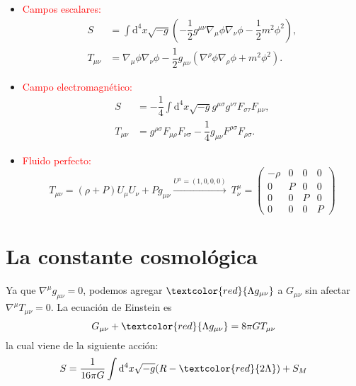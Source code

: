 \documentclass[../main]{subfiles}
\begin{document}
\ejemplo{}
\begin{itemize}
    \item \textcolor{red}{Campos escalares:}
    \begin{align}
        S &= \int \mathrm{d}^4 x \sqrt{-g} \left(-\dfrac{1}{2}g^{\mu\nu}\nabla_{\mu}\phi\nabla_{\nu}\phi-\dfrac{1}{2}m^2\phi^2\right),\\
        T_{\mu\nu} &= \nabla_{\mu}\phi \nabla_{\nu}\phi-\dfrac{1}{2}g_{\mu\nu}(\nabla^{\rho}\phi\nabla_{\rho}\phi+m^2\phi^2).
    \end{align}
    \item \textcolor{red}{Campo electromagnético:}
    \begin{align}
        S & = -\dfrac{1}{4}\int \mathrm{d}^4 x\sqrt{-g} g^{\mu\sigma}g^{\nu \tau} F_{\sigma \tau} F_{\mu\nu}, \\
        T_{\mu\nu} & = g^{\rho\sigma} F_{\mu\rho}F_{\nu\sigma}-\dfrac{1}{4}g_{\mu\nu}F^{\rho\sigma}F_{\rho\sigma}.
    \end{align}
    \item \textcolor{red}{Fluido perfecto:}
    \begin{equation}
        T_{\mu\nu}=(\rho+P)U_{\mu}U_{\nu}+Pg_{\mu\nu} \xrightarrow[]{U^{\mu}=(1, 0, 0, 0)} \ T^{\mu}_{\nu}=
        \begin{pmatrix}
            -\rho & 0 & 0 & 0 \\
            0     & P & 0 & 0 \\
            0     & 0 & P & 0 \\
            0     & 0 & 0 & P
        \end{pmatrix}
    \end{equation}
\end{itemize}

\section{La constante cosmológica}

Ya que $\nabla^{\mu} g_{\mu\nu}=0$, podemos agregar $\textcolor{red}{\Lambda g_{\mu\nu}}$ a $G_{\mu\nu}$ sin afectar $\nabla^{\mu}T_{\mu\nu}=0$. La ecuación de Einstein es 
\begin{equation}
    G_{\mu\nu}+\textcolor{red}{\Lambda g_{\mu\nu}}=8\pi G T_{\mu\nu}
\end{equation}
la cual viene de la siguiente acción:
\begin{equation}
    S = \dfrac{1}{16\pi G} \int \mathrm{d}^4 x\sqrt{-g} (R-\textcolor{red}{2\Lambda})+S_M
\end{equation}
\end{document}
